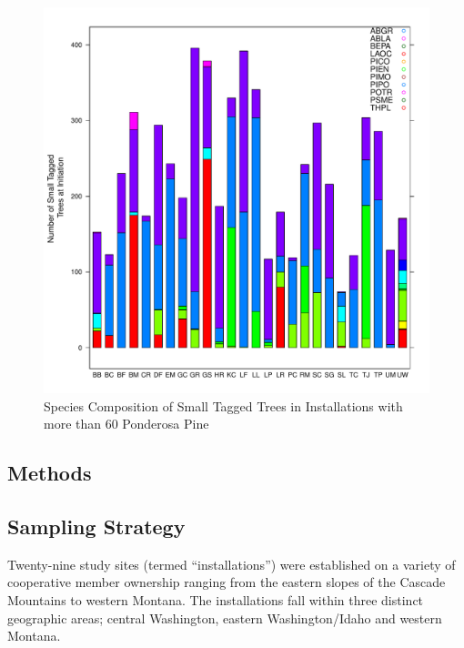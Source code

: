 \documentclass[11pt, letterpaper, fleqn]{article}
\begin{document}
\begin{figure}
\begin{center}
\includegraphics{Thesis_doc-speccomp}
\end{center}
\caption{Species Composition of Small Tagged Trees in Installations with more than 60 Ponderosa Pine}
\end{figure}





\newpage
\clearpage
\begin{center}
\section{Methods}
\end{center}
\normalsize
\subsection{Sampling Strategy}
\doublespacing
Twenty-nine study sites (termed ``installations'') were established on a variety of cooperative member ownership ranging from the eastern slopes of the Cascade Mountains to western Montana. The installations fall within three distinct geographic areas; central Washington, eastern Washington/Idaho and western Montana. \\[4pt]
\end{document}
